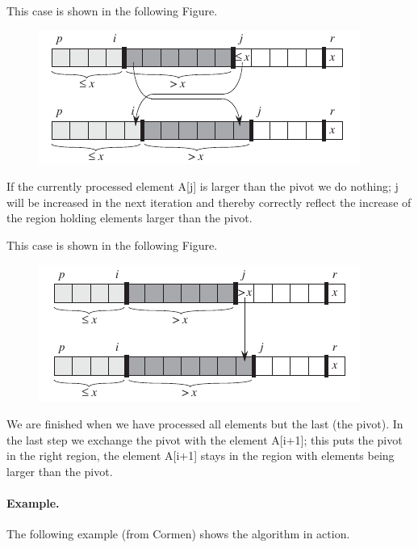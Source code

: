 This case is shown in the following Figure.

\begin{figure}[hbt!]
\centering
\includegraphics[scale=0.7]{images/quicksort_3.png}
\end{figure}


If the currently processed element A[j] is larger than the pivot we do nothing; j will be increased in the next iteration and thereby correctly reflect the increase of the region holding elements larger than the pivot.

This case is shown in the following Figure.

\begin{figure}[hbt!]
\centering
\includegraphics[scale=0.7]{images/quicksort_2.png}
\end{figure}


We are finished when we have processed all elements but the last (the pivot). In the last step we exchange the pivot with the element A[i+1]; this puts the pivot in the right region, the element A[i+1] stays in the region with elements being larger than the pivot.

\paragraph{Example.}

The following example (from Cormen) shows the algorithm in action.

